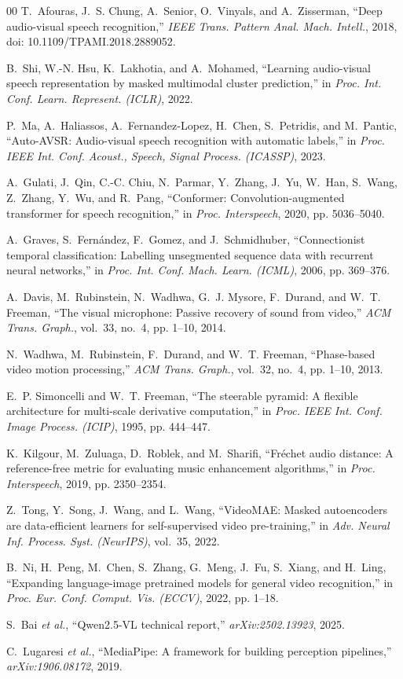 \documentclass[conference]{IEEEtran}
\begin{document}
\begin{thebibliography}{00}
T.~Afouras, J.~S. Chung, A.~Senior, O.~Vinyals, and A.~Zisserman, ``Deep
audio-visual speech recognition,'' \emph{IEEE Trans. Pattern Anal. Mach.
Intell.}, 2018, doi: 10.1109/TPAMI.2018.2889052.

B.~Shi, W.-N. Hsu, K.~Lakhotia, and A.~Mohamed, ``Learning audio-visual speech
representation by masked multimodal cluster prediction,'' in \emph{Proc. Int.
Conf. Learn. Represent. (ICLR)}, 2022.

P.~Ma, A.~Haliassos, A.~Fernandez-Lopez, H.~Chen, S.~Petridis, and M.~Pantic,
``Auto-AVSR: Audio-visual speech recognition with automatic labels,'' in
\emph{Proc. IEEE Int. Conf. Acoust., Speech, Signal Process. (ICASSP)}, 2023.

A.~Gulati, J.~Qin, C.-C. Chiu, N.~Parmar, Y.~Zhang, J.~Yu, W.~Han, S.~Wang,
Z.~Zhang, Y.~Wu, and R.~Pang, ``Conformer: Convolution-augmented transformer for
speech recognition,'' in \emph{Proc. Interspeech}, 2020, pp. 5036--5040.

A.~Graves, S.~Fern\'{a}ndez, F.~Gomez, and J.~Schmidhuber, ``Connectionist
temporal classification: Labelling unsegmented sequence data with recurrent
neural networks,'' in \emph{Proc. Int. Conf. Mach. Learn. (ICML)}, 2006, pp.
369--376.

A.~Davis, M.~Rubinstein, N.~Wadhwa, G.~J. Mysore, F.~Durand, and W.~T. Freeman,
``The visual microphone: Passive recovery of sound from video,'' \emph{ACM Trans.
Graph.}, vol.~33, no.~4, pp. 1--10, 2014.

N.~Wadhwa, M.~Rubinstein, F.~Durand, and W.~T. Freeman, ``Phase-based video
motion processing,'' \emph{ACM Trans. Graph.}, vol.~32, no.~4, pp. 1--10, 2013.

E.~P. Simoncelli and W.~T. Freeman, ``The steerable pyramid: A flexible
architecture for multi-scale derivative computation,'' in \emph{Proc. IEEE Int.
Conf. Image Process. (ICIP)}, 1995, pp. 444--447.

K.~Kilgour, M.~Zuluaga, D.~Roblek, and M.~Sharifi, ``Fr\'{e}chet audio distance:
A reference-free metric for evaluating music enhancement algorithms,'' in
\emph{Proc. Interspeech}, 2019, pp. 2350--2354.

Z.~Tong, Y.~Song, J.~Wang, and L.~Wang, ``VideoMAE: Masked autoencoders are
data-efficient learners for self-supervised video pre-training,'' in \emph{Adv.
Neural Inf. Process. Syst. (NeurIPS)}, vol.~35, 2022.

B.~Ni, H.~Peng, M.~Chen, S.~Zhang, G.~Meng, J.~Fu, S.~Xiang, and H.~Ling,
``Expanding language-image pretrained models for general video recognition,'' in
\emph{Proc. Eur. Conf. Comput. Vis. (ECCV)}, 2022, pp. 1--18.

S.~Bai \emph{et al.}, ``Qwen2.5-VL technical report,''
\emph{arXiv:2502.13923}, 2025.

C.~Lugaresi \emph{et al.}, ``MediaPipe: A framework for building perception
pipelines,'' \emph{arXiv:1906.08172}, 2019.

\end{thebibliography}
\end{document}
